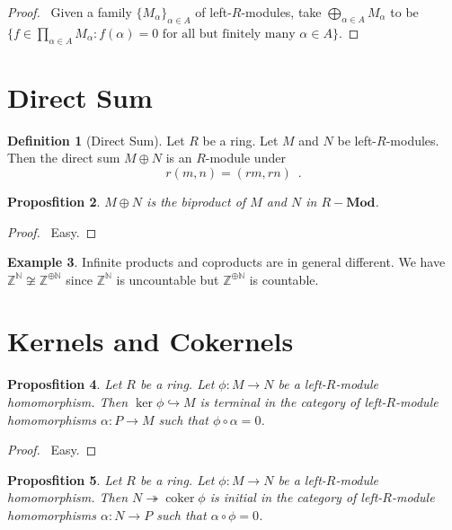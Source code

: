 \documentclass{book}
\let\qed\relax
\newtheorem{prop}{Proposfition}[chapter]
\theoremstyle{definition}
\newtheorem{df}[prop]{Definition}
\newtheorem{ex}[prop]{Example}
\newcommand{\coker}{\ensuremath{\operatorname{coker}}}
\newcommand{\Mod}[1]{\ensuremath{{#1}-\mathbf{Mod}}}
\begin{document}
\begin{proof}
\pf\ Given a family $\{M_\alpha \}_{\alpha \in A}$ of left-$R$-modules, take $\bigoplus_{\alpha \in A} M_\alpha$ to be $\{ f \in \prod_{\alpha \in A} M_\alpha : f(\alpha) = 0 \text{ for all but finitely many } \alpha \in A \}$. \qed
\end{proof}

\section{Direct Sum}

\begin{df}[Direct Sum]
Let $R$ be a ring. Let $M$ and $N$ be left-$R$-modules. Then the direct sum $M \oplus N$ is an $R$-module under
\[ r(m,n) = (rm,rn) \enspace . \]
\end{df}

\begin{prop}
$M \oplus N$ is the biproduct of $M$ and $N$ in $\Mod{R}$.
\end{prop}

\begin{proof}
\pf\ Easy. \qed
\end{proof}

\begin{ex}
Infinite products and coproducts are in general different. We have $\mathbb{Z}^{\mathbb{N}} \not\cong \mathbb{Z}^{\oplus \mathbb{N}}$ since $\mathbb{Z}^{\mathbb{N}}$ is uncountable but $\mathbb{Z}^{\oplus \mathbb{N}}$ is countable.
\end{ex}

\section{Kernels and Cokernels}

\begin{prop}
Let $R$ be a ring.
Let $\phi : M \rightarrow N$ be a left-$R$-module homomorphism. Then $\ker \phi \hookrightarrow M$ is terminal in the category of left-$R$-module homomorphisms $\alpha : P \rightarrow M$ such that $\phi \circ \alpha = 0$.
\end{prop}

\begin{proof}
\pf\ Easy. \qed
\end{proof}

\begin{prop}
Let $R$ be a ring.
Let $\phi : M \rightarrow N$ be a left-$R$-module homomorphism. Then $N \twoheadrightarrow \coker \phi$ is initial in the category of left-$R$-module homomorphisms $\alpha : N \rightarrow P$ such that $\alpha \circ \phi = 0$.
\end{prop}
\end{document}
